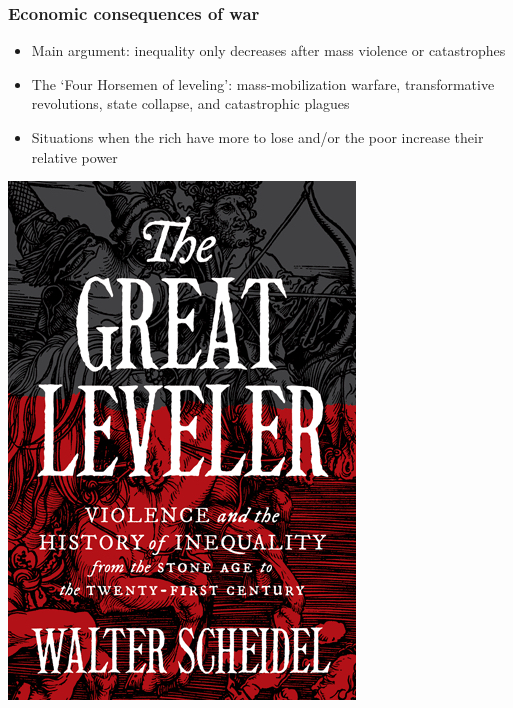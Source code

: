 \documentclass[aspectratio=43]{beamer}
\begin{document}



\begin{frame}
\frametitle{Economic consequences of war}
\centering

\begin{minipage}{0.59\textwidth}\centering
\begin{itemize}
  \item<2-> Main argument: inequality only decreases after mass violence or catastrophes
  \item<3-> The `Four Horsemen of leveling': mass-mobilization warfare, transformative revolutions, state collapse, and catastrophic plagues
  \item<4-> Situations when the rich have more to lose and/or the poor increase their relative power
\end{itemize}
\end{minipage}\hfill
\begin{minipage}{0.39\textwidth}\centering
\includegraphics[width = \textwidth]{img/scheidel}\\\vspace{10pt}

\end{minipage}
\end{frame}
\end{document}

